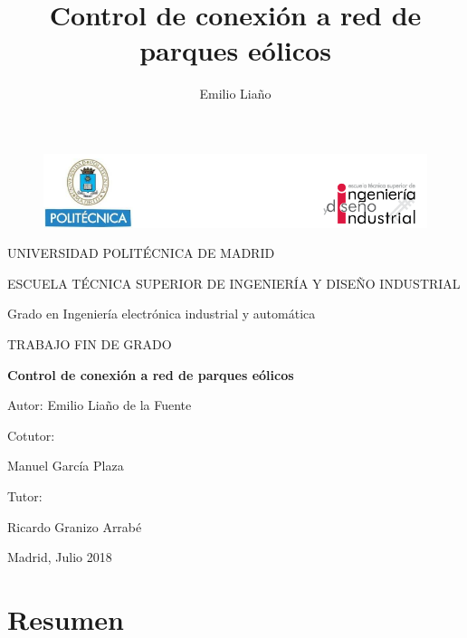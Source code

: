 \documentclass{book}
\title{Control de conexi\'on a red de parques e\'olicos}
\date{}
\author{Emilio Lia\~no}
\begin{document}
\begin{figure}[h!]
\centering
\includegraphics[width=\textwidth]{Encabezado.PNG}
\end{figure}
\begin{center}
	\LARGE
	UNIVERSIDAD POLIT\'ECNICA DE MADRID \par
	\vspace {10 mm}
	ESCUELA T\'ECNICA SUPERIOR DE INGENIER\'IA Y DISEÑO INDUSTRIAL\par
	\vspace {10 mm}
	\LARGE
	Grado en Ingenier\'ia electr\'onica industrial y autom\'atica \par
	\vspace {10 mm}
	\Huge
	TRABAJO FIN DE GRADO \par
	\vspace{20 mm}
	\LARGE
	\textbf{Control de conexi\'on a red de parques e\'olicos}\par
	\vspace {10 mm}
	Autor: Emilio Liaño de la Fuente \par
	\vspace {10 mm}
\end{center}
\begin{multicols}{2}
	\LARGE
	Cotutor:

	Manuel Garc\'ia Plaza \par
	Tutor:

	Ricardo Granizo Arrab\'e
\vfill
		
\end{multicols}

\begin{flushright}
\vfill
	Madrid, Julio 2018
\end{flushright}
\afterpage{\null\newpage}
\newpage
\normalsize
{}

\chapter*{Resumen}
\end{document}
